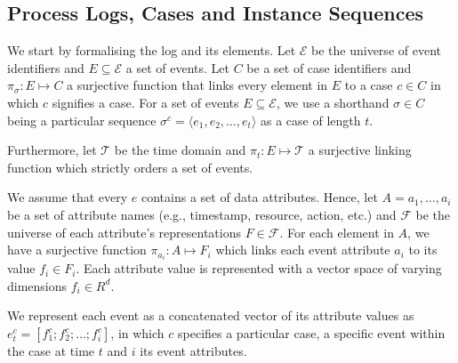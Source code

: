 \documentclass[./../../paper.tex]{subfiles}
\begin{document}
\subsection{Process Logs, Cases and Instance Sequences}


We start by formalising the log and its elements. Let $\mathcal{E}$ be the universe of event identifiers and $E \subseteq \mathcal{E}$ a set of events. Let $C$ be a set of case identifiers and $\pi_\sigma : E \mapsto C$ a surjective function that links every element in $E$ to a case $c \in C$ in which $c$ signifies a case. For a set of events $E \subseteq \mathcal{E}$, we use a shorthand $\sigma \in C$ being a particular sequence $\sigma^{c} = \langle e_1, e_2, \ldots, e_t \rangle$ as a case of length $t$. 

Furthermore, let $\mathcal{T}$ be the time domain and $\pi_t : E \mapsto \mathcal{T}$ a surjective linking function which strictly orders a set of events.

We assume that every $e$ contains a set of data attributes. Hence, let $A = a_1, \ldots, a_i$ be a set of attribute names (e.g., timestamp, resource, action, etc.) and $\mathcal{F}$ be the universe of each attribute's representations $F \in \mathcal{F}$. For each element in $A$, we have a surjective function $\pi_{a_i} : A \mapsto F_i$ which links each event attribute $a_i$ to its value $f_i \in F_i$. Each attribute value is represented with a vector space of varying dimensions $f_i \in R^d$.  

We represent each event as a concatenated vector of its attribute values as $e_t^{c} = [f_1^{c}; f_2^{c}; \ldots; f_i^{c}]$, in which $c$ specifies a particular case, a specific event within the case at time $t$ and $i$ its event attributes. 
\end{document}
